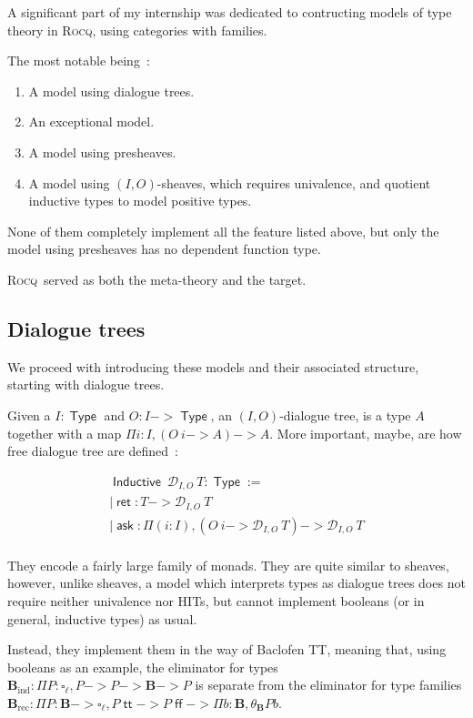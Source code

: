 \documentclass[11pt]{article}
\DeclareMathOperator{\Type}{\mathsf{Type}}
\DeclareMathOperator{\ask}{\mathsf{ask}}
\DeclareMathOperator{\Inductive}{\mathsf{Inductive}}
\DeclareMathOperator{\ret}{\mathsf{ret}}
\DeclareMathOperator{\rec}{rec}
\DeclareMathOperator{\ind}{ind}
\DeclareMathOperator{\true}{\mathsf{tt}}
\DeclareMathOperator{\false}{\mathsf{ff}}
\newcommand{\0}{\mathbf{0}}
\newcommand{\1}{\mathbf{1}}
\newcommand{\bool}{\mathbf{B}}
\newcommand{\rocq}{\textsc{Rocq}}
\begin{document}
A significant part of my internship was dedicated to contructing models of type theory in \rocq, using categories with families.

The most notable being~:
\begin{enumerate}
    \item A model using dialogue trees.
    \item An exceptional model.
    \item A model using presheaves.
    \item A model using $(I,O)$-sheaves, which requires univalence, and quotient inductive types to model positive types.
\end{enumerate}

None of them completely implement all the feature listed above, but only the model using presheaves has no dependent function type.

\rocq\ served as both the meta-theory and the target.

\subsection{Dialogue trees}

We proceed with introducing these models and their associated structure, starting with dialogue trees.

Given a $I : \Type$ and $O : I -> \Type$, an $(I,O)$-dialogue tree, is a type $A$ together with a map $\Pi i : I, (O\ i-> A) -> A$.
More important, maybe, are how free dialogue tree are defined~: 

$$
\begin{array}{l}
    \Inductive\ \mathcal{D}_{I,O}\ T : \Type := \\
    \mid \ret : T -> \mathcal{D}_{I,O}\ T\\
    \mid \ask : \Pi (i : I),(O\ i -> \mathcal{D}_{I,O}\ T) -> \mathcal{D}_{I,O}\ T\\
\end{array}
$$

They encode a fairly large family of monads.
They are quite similar to sheaves, however, unlike sheaves, a model which interprets types as dialogue trees does not require neither univalence nor HITs, but cannot implement booleans (or in general, inductive types) as usual.

Instead, they implement them in the way of Baclofen TT, meaning that, using booleans as an example, the eliminator for types $\bool_{\ind} : \Pi P : \square_\ell, P -> P -> \bool -> P $ is separate from the eliminator for type families $\bool_{\rec} : \Pi P : \bool -> \square_\ell, P \true -> P \false -> \Pi b : \bool, \theta_\bool P b$.
\end{document}
